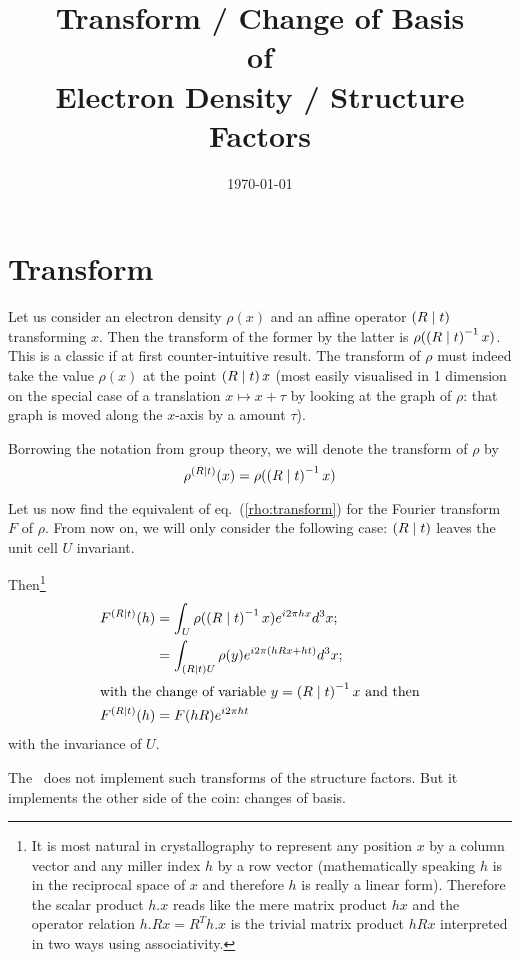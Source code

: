 \documentclass[11pt]{article}
\title{Transform / Change of Basis\\of\\Electron Density / Structure Factors}
\author{\lucjbourhis}
\date{\today}                                           %
\begin{document}
\maketitle

\section{Transform}

Let us consider an electron density $\rho(x)$ and an affine operator $\left( R \mid t \right)$ transforming $x$. Then the transform of the former by the latter is $\rho(\left( R \mid t \right)^{-1}x)$. This is a classic if at first counter-intuitive result. The transform of $\rho$ must indeed take the value $\rho(x)$ at the point $\left( R \mid t \right)x$ (most easily visualised in 1 dimension on the special case of a translation $x \mapsto x+\tau$ by looking at the graph of $\rho$: that graph is moved along the $x$-axis by a amount $\tau$).

Borrowing the notation from group theory, we will denote the transform of $\rho$ by
\begin{equation}
\rho^{\left( R \mid t \right)}(x) = \rho(\left( R \mid t \right)^{-1}x)
\label{rho:transform}
\end{equation}

Let us now find the equivalent of eq.~(\ref{rho:transform}) for the Fourier transform $F$ of $\rho$. From now on, we will only consider the following case: $\left( R \mid t \right)$ leaves the unit cell $U$ invariant.

Then\footnote{It is most natural in crystallography to represent any position $x$ by a column vector and any miller index $h$ by a row vector (mathematically speaking $h$ is in the reciprocal space of $x$ and therefore $h$ is really a linear form). Therefore the scalar product $h.x$ reads like the mere matrix product $hx$ and the operator relation $h.Rx = R^Th.x$ is the trivial matrix product $hRx$ interpreted in two ways using associativity.}
\begin{align}
F^{\left( R \mid t \right)}(h) &= \int_U \rho(\left( R \mid t \right)^{-1}x) e^{i2\pi hx} d^3x ; \nonumber \\
&= \int_{\left( R \mid t \right)U} \rho(y) e^{i2\pi (hRx + ht)} d^3x ;\nonumber\\
\intertext{with the change of variable $y = \left( R \mid t \right)^{-1}x$ and then}
F^{\left( R \mid t \right)}(h) &= F(hR) e^{i2\pi ht}
\end{align}
with the invariance of $U$.

The \cctbx\ does not implement such transforms of the structure factors. But it implements the other side of the coin: changes of basis.
\end{document}
